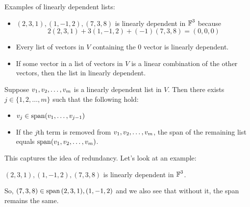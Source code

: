 Examples of linearly dependent lists:
\begin{itemize}
    \item $(2, 3, 1), (1, -1, 2), (7, 3, 8)$ is linearly dependent in $\operatorname{\mathbb{F}}^3$ because
    \[ 2(2, 3, 1) + 3 (1, -1, 2) + (-1)(7, 3, 8) = (0, 0, 0)\]
    \item Every list of vectors in $V$ containing the 0 vector is linearly dependent.
    \item If some vector in a list of vectors in $V$ is a linear combination of the other vectors, then
    the list in linearly dependent.
\end{itemize}

\begin{theorem}
    Suppose $v_1, v_2, \ldots, v_m$ is a linearly dependent list in $V$. Then there exists
    $j \in \{ 1, 2, \dots, m \}$ such that the following hold:
    \begin{itemize}
        \item $v_j \in \operatorname{span}(v_1, \dots, v_{j - 1})$
        \item If the $j$th term is removed from $v_1, v_2, \ldots, v_m$, the span of
        the remaining list equals $\operatorname{span}(v_1, v_2, \ldots, v_m)$.
    \end{itemize}
\end{theorem}

This captures the idea of redundancy. Let's look at an example:

$(2, 3, 1), (1, -1, 2), (7, 3, 8)$ is linearly dependent in $\operatorname{\mathbb{F}}^3$.

So, $(7, 3, 8) \in \operatorname{span}{(2, 3, 1), (1, -1, 2)}$ and we also see that without it,
the span remains the same.

